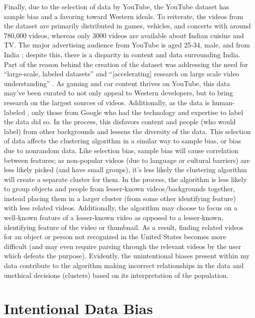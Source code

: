 \documentclass[10pt,twocolumn]{article}
\begin{document}
Finally, due to the selection of data by YouTube, the YouTube dataset has sample bias and a favoring toward Western ideals. To reiterate, the videos from the dataset are primarily distributed in games, vehicles, and concerts with around 780,000 videos, whereas only 3000 videos are available about Indian cuisine and TV. The major advertising audience from YouTube is aged 25-34, male, and from India \cite{HootSuite2022}; despite this, there is a disparity in content and data surrounding India. Part of the reason behind the creation of the dataset was addressing the need for “large-scale, labeled datasets” and “[accelerating] research on large scale video understanding” \cite{Warrick2020}. As gaming and car content thrives on YouTube, this data may’ve been curated to not only appeal to Western developers, but to bring research on the largest sources of videos. Additionally, as the data is human-labeled \cite{googleYT8M}, only those from Google who had the technology and expertise to label the data did so. In the process, this disfavors content and people (who would label) from other backgrounds and lessens the diversity of the data. This selection of data affects the clustering algorithm in a similar way to sample bias, or bias due to nonrandom data. Like selection bias, sample bias will cause correlation between features; as non-popular videos (due to language or cultural barriers) are less likely picked (and have small groups), it’s less likely the clustering algorithm will create a separate cluster for them. In the process, the algorithm is less likely to group objects and people from lesser-known videos/backgrounds together, instead placing them in a larger cluster (from some other identifying feature) with less related videos. Additionally, the algorithm may choose to focus on a well-known feature of a lesser-known video as opposed to a lesser-known, identifying feature of the video or thumbnail. As a result, finding related videos for an object or person not recognized in the United States becomes more difficult (and may even require parsing through the relevant videos by the user which defeats the purpose). Evidently, the unintentional biases present within my data contribute to the algorithm making incorrect relationships in the data and unethical decisions (clusters) based on its interpretation of the population.

\section {Intentional Data Bias}
\end{document}
